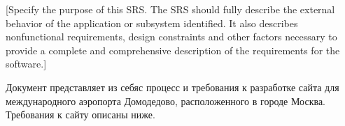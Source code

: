 [Specify the purpose of this SRS. The SRS should 
fully describe the external behavior of the 
application or subsystem identified. It also 
describes nonfunctional requirements, design 
constraints and other factors necessary to 
provide a complete and comprehensive description 
of the requirements for the software.]

Документ представляет из себяс процесс и требования 
к разработке сайта для международного
аэропорта Домодедово, расположенного в 
городе Москва. Требования к сайту описаны ниже.

